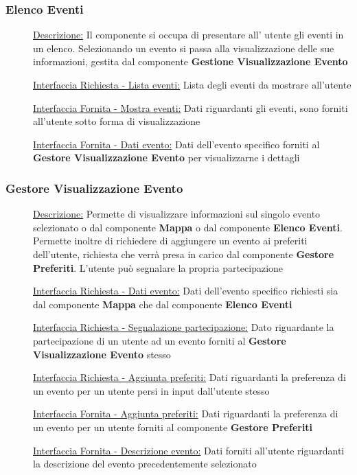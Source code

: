 \documentclass{article}
\begin{document}
\subsubsection{Elenco Eventi}
\begin{description}
    \item[] \underline{Descrizione:} Il componente si occupa di presentare all' utente gli eventi in un elenco. Selezionando un evento si passa alla visualizzazione delle sue informazioni, gestita dal componente \textbf{Gestione Visualizzazione Evento}
    \item[] \underline{Interfaccia Richiesta - Lista eventi:} Lista degli eventi da mostrare all'utente
    \item[] \underline{Interfaccia Fornita - Mostra eventi:} Dati riguardanti gli eventi, sono forniti all'utente sotto forma di visualizzazione
    \item[] \underline{Interfaccia Fornita - Dati evento:} Dati dell'evento specifico forniti al \textbf{Gestore Visualizzazione Evento} per visualizzarne i dettagli
\end{description}
\subsubsection{Gestore Visualizzazione Evento}
\begin{description}
    \item[] \underline{Descrizione:} Permette di visualizzare informazioni sul singolo evento selezionato o dal componente \textbf{Mappa} o dal componente \textbf{Elenco Eventi}. Permette inoltre di richiedere di aggiungere un evento ai preferiti dell'utente, richiesta che verrà presa in carico dal componente \textbf{Gestore Preferiti}. L'utente può segnalare la propria partecipazione
    \item[] \underline{Interfaccia Richiesta - Dati evento:} Dati dell'evento specifico richiesti sia dal componente \textbf{Mappa} che dal componente \textbf{Elenco Eventi}
    \item[] \underline{Interfaccia Richiesta - Segnalazione partecipazione:} Dato riguardante la partecipazione di un utente ad un evento forniti al \textbf{Gestore Visualizzazione Evento} stesso
    \item[] \underline{Interfaccia Richiesta - Aggiunta preferiti:} Dati riguardanti la preferenza di un evento per un utente persi in input dall'utente stesso
    \item[] \underline{Interfaccia Fornita - Aggiunta preferiti:} Dati riguardanti la preferenza di un evento per un utente forniti al componente \textbf{Gestore Preferiti}
    \item[] \underline{Interfaccia Fornita - Descrizione evento:} Dati forniti all'utente riguardanti la descrizione del evento precedentemente selezionato
\end{description}
\end{document}

